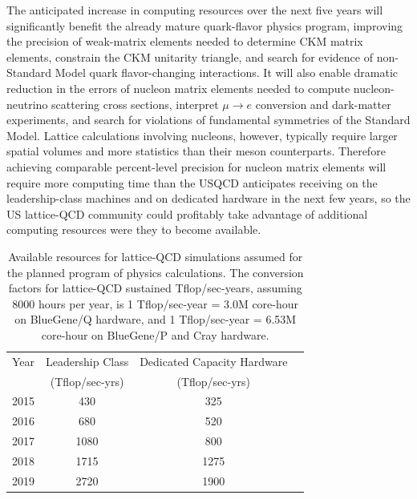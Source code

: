 The anticipated increase in computing resources over the next five years will
significantly benefit the already mature quark-flavor physics program,
improving the precision of weak-matrix elements needed to determine CKM matrix
elements, constrain the CKM unitarity triangle, and search for evidence of
non-Standard Model quark flavor-changing interactions.  It will also enable
dramatic reduction in the errors of nucleon matrix elements needed to compute
nucleon-neutrino scattering cross sections, interpret $\mu \to e$ conversion
and dark-matter experiments, and search for violations of fundamental
symmetries of the Standard Model.  Lattice calculations involving nucleons,
however, typically require larger spatial volumes and more statistics than
their meson counterparts.  Therefore achieving comparable percent-level
precision for nucleon matrix elements will require more computing time than
the USQCD anticipates receiving on the leadership-class machines and on
dedicated hardware in the next few years, so the US lattice-QCD community
could profitably take advantage of additional computing resources were they to
become available.

\begin{table}[t]
\begin{center}
\caption{Available resources for lattice-QCD simulations assumed for the planned program of physics calculations.  The conversion factors for lattice-QCD sustained
Tflop/sec-years, assuming 8000 hours per year, is 1 Tflop/sec-year = 3.0M core-hour on BlueGene/Q hardware, and 1 Tflop/sec-year = 6.53M core-hour on BlueGene/P and Cray hardware. \vspace{1.5mm}}
\label{tab:fiveyear}
\begin{tabular}{lccc}
\hline\hline  
Year & Leadership Class  & Dedicated Capacity Hardware  \\[-0.75mm] 
& (Tflop/sec-yrs) & (Tflop/sec-yrs) \\[0.5mm] \hline
2015 & 430 & 325 \\
2016 & 680 & 520 \\
2017 & 1080 & 800 \\
2018 & 1715 & 1275 \\ 
2019 & 2720 & 1900 \\ \hline\hline
\end{tabular}
\end{center}
\end{table}

